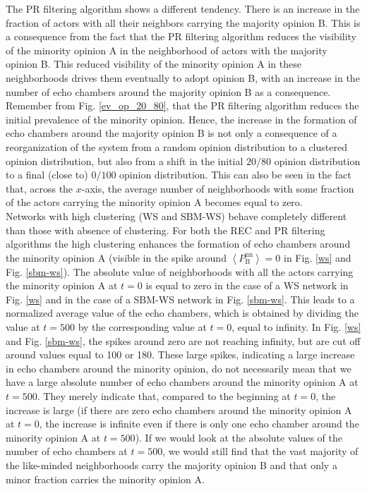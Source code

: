 \documentclass[11 pt , letterpaper , twoside , openright]{book}
\begin{document}
\newline
The PR filtering algorithm shows a different tendency. There is an increase in the fraction of actors with all their neighbors carrying the majority opinion B. This is a consequence from the fact that the PR filtering algorithm reduces the visibility of the minority opinion A in the neighborhood of actors with the majority opinion B. This reduced visibility of the minority opinion A in these neighborhoods drives them eventually to adopt opinion B, with an increase in the number of echo chambers around the majority opinion B as a consequence. Remember from Fig. \ref{ev_op_20_80}, that the PR filtering algorithm reduces the initial prevalence of the minority opinion. Hence, the increase in the formation of echo chambers around the majority opinion B is not only a consequence of a reorganization of the system from a random opinion distribution to a clustered opinion distribution, but also from a shift in the initial $20/80$ opinion distribution to a final (close to) $0/100$ opinion distribution. This can also be seen in the fact that, across the $x$-axis, the average number of neighborhoods with some fraction of the actors carrying the minority opinion A becomes equal to zero. \\
\newline
Networks with high clustering (WS and SBM-WS) behave completely different than those with absence of clustering. For both the REC and PR filtering algorithms the high clustering enhances the formation of echo chambers around the minority opinion A (visible in the spike around $\left<P_\text{B}^{\text{nn}}\right> = 0$ in Fig. \ref{ws} and Fig. \ref{sbm-ws}). The absolute value of neighborhoods with all the actors carrying the minority opinion A at $t=0$ is equal to zero in the case of a WS network in Fig. \ref{ws} and in the case of a SBM-WS network in Fig. \ref{sbm-ws}. This leads to a normalized average value of the echo chambers, which is obtained by dividing the value at $t=500$ by the corresponding value at $t=0$, equal to infinity. In Fig. \ref{ws} and Fig. \ref{sbm-ws}, the spikes around zero are not reaching infinity, but are cut off around values equal to 100 or 180. These large spikes, indicating a large increase in echo chambers around the minority opinion, do not necessarily mean that we have a large absolute number of echo chambers around the minority opinion A at $t=500$. They merely indicate that, compared to the beginning at $t=0$, the increase is large (if there are zero echo chambers around the minority opinion A at $t=0$, the increase is infinite even if there is only one echo chamber around the minority opinion A at $t=500$). If we would look at the absolute values of the number of echo chambers at $t=500$, we would still find that the vast majority of the like-minded neighborhoods carry the majority opinion B and that only a minor fraction carries the minority opinion A.\\
\end{document}
